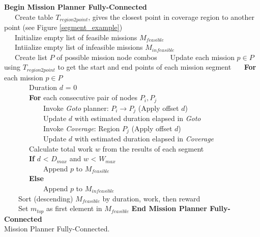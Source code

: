 \documentclass{tamuccthesis}
\begin{document}
\begin{algorithm}%
\textbf{Begin Mission Planner Fully-Connected}\\
~~~Create table $T_{region2point}$, gives the closest point in coverage region to another point (see Figure \ref{segment_example}) \\
~~~Initialize empty list of feasible missions $M_{feasible}$ \\
~~~Intiialize empty list of infeasible missions $M_{infeasible}$ \\
~~~Create list $P$ of possible mission node combos 
~~~Update each mission $p \in P$ using $T_{region2point}$ to get the start and end points of each mission segment
~~~\textbf{For} each mission $p \in P$ \\
~~~~~~~Duration $d$ = 0 \\
~~~~~~~\textbf{For} each consecutive pair of nodes $P_i, P_j$ \\ 
~~~~~~~~~~~Invoke \textit{Goto} planner: $P_i \rightarrow P_j$ (Apply offset $d$) \\
~~~~~~~~~~~Update $d$ with estimated duration elapsed in \textit{Goto} \\
~~~~~~~~~~~Invoke \textit{Coverage}: Region $P_j$ (Apply offset $d$) \\
~~~~~~~~~~~Update $d$ with estimated duration elapsed in \textit{Coverage} \\
~~~~~~~Calculate total work $w$ from the results of each segment \\
~~~~~~~\textbf{If} $d$ < $D_{max}$ and $w$ < $W_{max}$ \\
~~~~~~~~~~~Append $p$ to $M_{feasible}$ \\
~~~~~~~\textbf{Else} \\
~~~~~~~~~~~Append $p$ to $M_{infeasible}$ \\
~~~~Sort (descending) $M_{feasible}$ by duration, work, then reward \\
~~~~Set $m_{top}$ as first element in $M_{feasible}$ 
\textbf{End Mission Planner Fully-Connected}\\
\caption[Mission Planner Fully-Connected.]{Mission Planner Fully-Connected.}
\label{alg:MPFC}
\end{algorithm}
\end{document}
